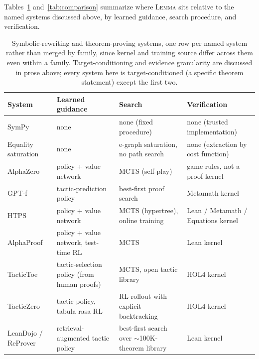 \documentclass[11pt]{article}
\numberwithin{equation}{section}
\newcommand{\lemma}{\textsc{Lemma}}
\begin{document}
Tables~\ref{tab:comparison-provers} and~\ref{tab:comparison} summarize where \lemma{} sits relative to the named systems discussed above, by learned guidance, search procedure, and verification.

\begin{table}[htbp]
\centering
\small
\begin{tabular}{@{}p{3.4cm}p{3.6cm}p{3.6cm}p{3.6cm}@{}}
\toprule
System & Learned guidance & Search & Verification \\
\midrule
SymPy \citep{sympy2017} & none & none (fixed procedure) & none (trusted implementation) \\
Equality saturation \citep{tate2009equality,egg2021} & none & e-graph saturation, no path search & none (extraction by cost function) \\
AlphaZero \citep{silver2018alphazero} & policy + value network & MCTS (self-play) & game rules, not a proof kernel \\
GPT-f \citep{polu2020gptf} & tactic-prediction policy & best-first proof search & Metamath kernel \\
HTPS \citep{lample2022htps} & policy + value network & MCTS (hypertree), online training & Lean / Metamath / Equations kernel \\
AlphaProof \citep{hubert2025alphaproof} & policy + value network, test-time RL & MCTS & Lean kernel \\
TacticToe \citep{gauthier2021tactictoe} & tactic-selection policy (from human proofs) & MCTS, open tactic library & HOL4 kernel \\
TacticZero \citep{wu2021tacticzero} & tactic policy, tabula rasa RL & RL rollout with explicit backtracking & HOL4 kernel \\
LeanDojo / ReProver \citep{yang2023leandojo} & retrieval-augmented tactic policy & best-first search over $\sim$100K-theorem library & Lean kernel \\
\bottomrule
\end{tabular}
\caption{Symbolic-rewriting and theorem-proving systems, one row per named system rather than merged by family, since kernel and training source differ across them even within a family. Target-conditioning and evidence granularity are discussed in prose above; every system here is target-conditioned (a specific theorem statement) except the first two.}
\label{tab:comparison-provers}
\end{table}
\end{document}
